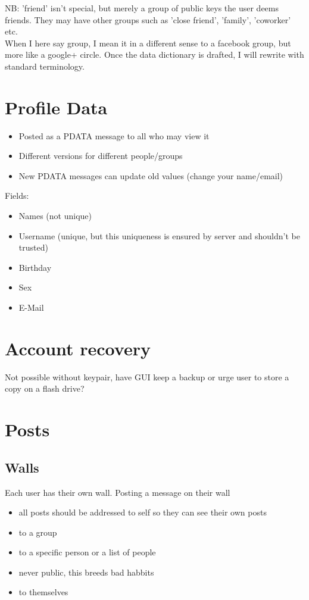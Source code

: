 
NB: 'friend' isn't special, but merely a group of public keys the user deems
friends. They may have other groups such as 'close friend', 'family', 'coworker'
etc.\\
When I here say group, I mean it in a different sense to a facebook group, but
more like a google+ circle. Once the data dictionary is drafted, I will rewrite
with standard terminology.

\section{Profile Data}
    \begin{itemize}
    \item Posted as a PDATA message to all who may view it
    \item Different versions for different people/groups
    \item New PDATA messages can update old values (change your name/email)
    \end{itemize}
    
    Fields:
    \begin{itemize}
        \item Names (not unique)
        \item Username (unique, but this uniqueness is ensured by server and shouldn't
		    be trusted)
        \item Birthday
        \item Sex
        \item E-Mail
    \end{itemize}

\section{Account recovery}
Not possible without keypair, have GUI keep a backup or urge user to store a
copy on a flash drive?

\section{Posts}
    \subsection{Walls}
        Each user has their own wall.
        Posting a message on their wall
            \begin{itemize}
            \item all posts should be addressed to self so they can see their own posts
            \item to a group
            \item to a specific person or a list of people
            \item never public, this breeds bad habbits
            \item to themselves
            \end{itemize}
        

